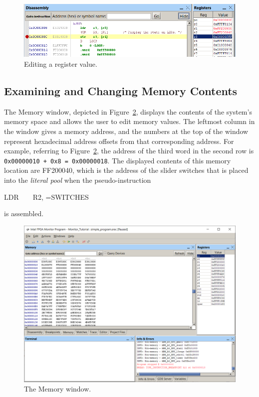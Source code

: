 \documentclass[11pt, twoside, pdftex]{article}
\begin{document}
\begin{figure}[H]
   \begin{center}
      \includegraphics[scale=1]{screenshots/figure19.png}
   \end{center}
   \caption{Editing a register value.} 
	 \label{fig:19}
\end{figure}

\subsection{Examining and Changing Memory Contents}
\label{sec:3.8}

The Memory window, depicted in Figure~\ref{fig:20}, displays the contents
of the system's memory space and allows the user to edit memory
values. The leftmost column in the window gives a memory address,
and the numbers at the top of the window represent hexadecimal
address offsets from that corresponding address. For example, referring to Figure~\ref{fig:20}, the address of the third word in the
second row is \texttt{0x00000010 + 0x8 = 0x00000018}.
The displayed contents of this memory location are FF200040,
which is the address of the slider switches that is placed into
the {\it literal pool} when the pseudo-instruction
\begin{center}
LDR~~~~R2, =SWITCHES
\end{center}
\noindent
is assembled.

\begin{figure}[H]
   \begin{center}
      \includegraphics[scale=0.6]{screenshots/figure20.png}
   \end{center}
   \caption{The Memory window.}
	 \label{fig:20}
\end{figure}
\end{document}

